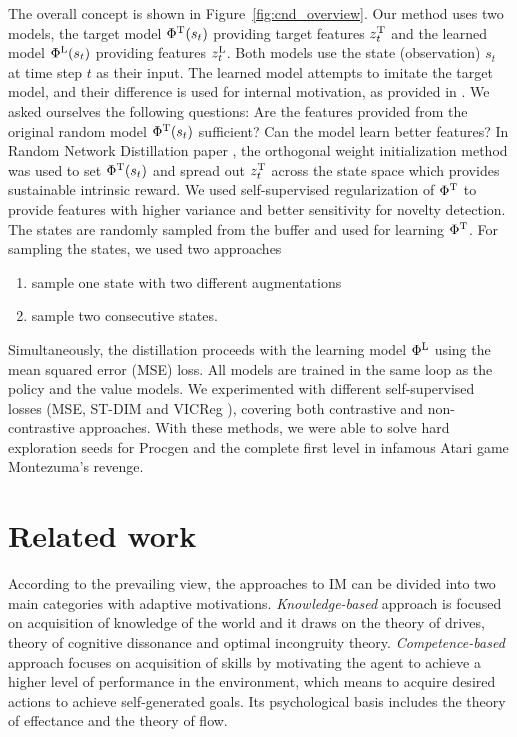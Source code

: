 \documentclass[a4paper,11pt]{elsarticle}
\begin{document}
The overall concept is shown in Figure~\ref{fig:cnd_overview}.
Our method uses two models, the target model $\Phi^{\rm T}(s_t)$ providing target features $z_{t}^{\rm T}$ and the learned model $\Phi^{\rm L}(s_t)$ providing features $z_{t}^{\rm L}$. Both models use the state (observation) $s_t$ at time step $t$ as their input. 
The learned model attempts to imitate the target model, and their difference is used for internal motivation, as provided in \cite{burda2018exploration}.
We asked ourselves the following questions: Are the features provided from the original random model $\Phi^{\rm T}(s_t)$ sufficient? Can the model learn better features? In Random Network Distillation paper \citep{burda2018exploration}, the orthogonal weight initialization method was used to set $\Phi^{\rm T}(s_t)$ and spread out $z_{t}^{\rm T}$ across the state space which provides sustainable intrinsic reward.
We used self-supervised regularization of $\Phi^{\rm T}$ to provide features with higher variance and better sensitivity for novelty detection. 
The states are randomly sampled from the buffer and used for learning $\Phi^{\rm T}$. 
For sampling the states, we used two approaches
\begin{enumerate}
    \item sample one state with two different augmentations
    \item sample two consecutive states.
\end{enumerate}
Simultaneously, the distillation proceeds with the learning model $\Phi^{\rm L}$ using the mean squared error (MSE) loss.
All models are trained in the same loop as the policy and the value models.
We experimented with different self-supervised losses (MSE, ST-DIM \cite{Anand2019} and VICReg \cite{Bardes2022}), covering both contrastive and non-contrastive approaches.
With these methods, we were able to solve hard exploration seeds for Procgen and the complete  first level in infamous Atari game Montezuma's revenge.

\section{Related work}
\label{sec:related-work}

According to the prevailing view, the approaches to IM can be divided into two main categories with adaptive motivations.
\textit{Knowledge-based} approach is focused on acquisition of knowledge of the world and it draws on the theory of drives, theory of cognitive dissonance and optimal incongruity theory. \textit{Competence-based} approach focuses on acquisition of skills by motivating the agent to achieve a higher level of performance in the environment, which means to acquire desired actions to achieve self-generated goals. Its psychological basis includes the theory of effectance and the theory of flow. 
\end{document}
